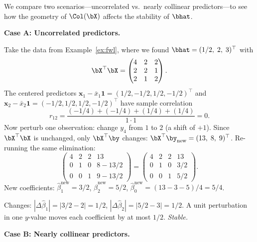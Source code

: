 \begin{example}\label{ex:multicollinearity}
We compare two scenarios---uncorrelated vs.\ nearly collinear predictors---to
see how the geometry of $\Col(\bX)$ affects the stability of $\bhat$.

\medskip\noindent\textbf{Case A: Uncorrelated predictors.}

Take the data from Example~\ref{ex:fwl}, where we found $\bhat = (1/2,\;2,\;3)^\top$
with
\[
\bX^\top\bX = \begin{pmatrix}4&2&2\\2&2&1\\2&1&2\end{pmatrix}.
\]
The centered predictors $\bm{x}_1 - \bar{x}_1\bm{1} = (1/2,-1/2,1/2,-1/2)^\top$
and $\bm{x}_2 - \bar{x}_2\bm{1} = (-1/2,1/2,1/2,-1/2)^\top$ have sample correlation
\[
r_{12} = \frac{(-1/4)+(-1/4)+(1/4)+(1/4)}{1\cdot 1} = 0.
\]
Now perturb one observation: change $y_4$ from $1$ to $2$ (a shift of $+1$).
Since $\bX^\top\bX$ is unchanged, only $\bX^\top\by$ changes:
$\bX^\top\by_{\text{new}} = (13,\;8,\;9)^\top$.
Re-running the same elimination:
\[
\left(\begin{array}{ccc|c}
4&2&2&13\\0&1&0&8-13/2\\0&0&1&9-13/2
\end{array}\right)
= \left(\begin{array}{ccc|c}
4&2&2&13\\0&1&0&3/2\\0&0&1&5/2
\end{array}\right).
\]
New coefficients: $\hat\beta_1^{\text{new}} = 3/2$, $\hat\beta_2^{\text{new}} = 5/2$,
$\hat\beta_0^{\text{new}} = (13-3-5)/4 = 5/4$.

Changes: $|\Delta\hat\beta_1| = |3/2-2| = 1/2$, $|\Delta\hat\beta_2| = |5/2-3| = 1/2$.
A unit perturbation in one $y$-value moves each coefficient by at most $1/2$.
\emph{Stable.}

\medskip\noindent\textbf{Case B: Nearly collinear predictors.}


\end{example}
